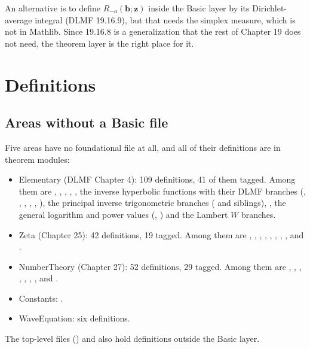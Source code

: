 \documentclass[11pt,a4paper]{article}
\begin{document}
An alternative is to define \(R_{-a}(\mathbf b;\mathbf z)\) inside the Basic layer by its
Dirichlet-average integral (DLMF 19.16.9), but that needs the simplex measure, which is not in
Mathlib. Since 19.16.8 is a generalization that the rest of Chapter 19 does not need, the theorem
layer is the right place for it.

\section{Definitions}\label{sec:definitions}

\subsection{Areas without a Basic file}

Five areas have no foundational file at all, and all of their definitions are in theorem
modules:
\begin{itemize}
  \item Elementary (DLMF Chapter 4): 109 definitions, 41 of them tagged. Among them are
    , , , , , the inverse hyperbolic
    functions with their DLMF branches (, , ,
    , , ), the principal inverse trigonometric
    branches ( and siblings), , the general logarithm
    and power values (, ) and the Lambert \(W\)
    branches.
  \item Zeta (Chapter 25): 42 definitions, 19 tagged. Among them are
    , , , ,
    , , , ,
     and .
  \item NumberTheory (Chapter 27): 52 definitions, 29 tagged. Among them are
    , , , ,
    , , , 
    and .
  \item Constants: .
  \item WaveEquation: six definitions.
\end{itemize}
The top-level files  () and
 also hold definitions outside the Basic layer.
\end{document}

